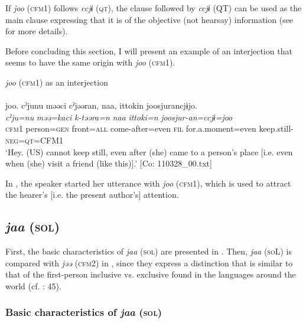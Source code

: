   If \textit{joo} (\textsc{cfm}1) follows \textit{ccjɨ} (\textsc{qt}), the clause followed by \textit{ccjɨ} (QT) can be used as the main clause expressing that it is of the objective (not hearsay) information (see  for more details).

  Before concluding this section, I will present an example of an interjection that seems to have the same origin with \textit{joo} (\textsc{cfm}1).

\ea\label{ex:10.89}   \textit{joo} (\textsc{cfm}1) as an interjection\\\\
      \glll    joo.  cˀjunu  məəci  cˀjəəran,  naa,  {\textbar}ittoki{\textbar}n  joosjurancjɨjo.\\
    \textit{}  \textit{cˀju=nu}  \textit{məə=kaci}  \textit{k-təəra=n}  \textit{naa}  \textit{ittoki=n}   \textit{joosjur-an=ccjɨ=joo}\\
    \textsc{cfm}1  person=\textsc{gen}  front=\textsc{all}  come-after=even  \textsc{fil}  for.a.moment=even  keep.still-\textsc{neg}=\textsc{qt}=CFM1\\
\glt     ‘Hey. (US) cannot keep still, even after (she) came to a person’s place [i.e. even when (she) visit a friend (like this)].’  [Co: 110328\_00.txt]
\z

In , the speaker started her utterance with \textit{joo} (\textsc{cfm}1), which is used to attract the hearer’s [i.e. the present author’s] attention.

\subsection{\textit{jaa} (\textsc{sol})}\label{sec:10.5.2}

First, the basic characteristics of \textit{jaa} (\textsc{sol}) are presented in . Then, \textit{jaa} (\textsc{so}L) is compared with \textit{jəə} (\textsc{cfm}2) in , since they express a distinction that is similar to that of the first-person inclusive vs. exclusive found in the languages around the world (cf. \citealt{Payne1997}: 45).

\subsubsection{Basic characteristics of \textit{jaa} (\textsc{sol})}\label{sec:10.5.2.1}

